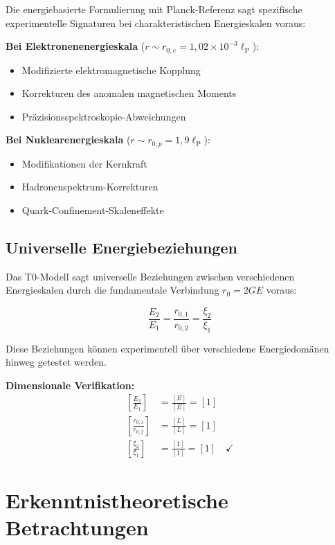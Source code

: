 \documentclass[12pt,a4paper]{report}
\newcommand{\lP}{\ell_{\text{P}}}         %
\newcommand{\rzero}{r_0}                  %
\begin{document}
	Die energiebasierte Formulierung mit Planck-Referenz sagt spezifische experimentelle Signaturen bei charakteristischen Energieskalen voraus:
	
	\textbf{Bei Elektronenenergieskala} ($r \sim r_{0,e} = 1,02 \times 10^{-3} \lP$):
	\begin{itemize}
		\item Modifizierte elektromagnetische Kopplung
		\item Korrekturen des anomalen magnetischen Moments
		\item Präzisionsspektroskopie-Abweichungen
	\end{itemize}
	
	\textbf{Bei Nuklearenergieskala} ($r \sim r_{0,p} = 1,9 \lP$):
	\begin{itemize}
		\item Modifikationen der Kernkraft
		\item Hadronenspektrum-Korrekturen
		\item Quark-Confinement-Skaleneffekte
	\end{itemize}
	
	\subsection{Universelle Energiebeziehungen}\label{subsec:universal_energy_relationships}
	
	Das T0-Modell sagt universelle Beziehungen zwischen verschiedenen Energieskalen durch die fundamentale Verbindung $\rzero = 2GE$ voraus:
	
	\begin{equation}
		\frac{E_2}{E_1} = \frac{r_{0,1}}{r_{0,2}} = \frac{\xi_{2}}{\xi_{1}}
		\label{eq:universal_energy_ratios}
	\end{equation}
	
	Diese Beziehungen können experimentell über verschiedene Energiedomänen hinweg getestet werden.
	
	\textbf{Dimensionale Verifikation:}
	\begin{align}
		\left[\frac{E_2}{E_1}\right] &= \frac{[E]}{[E]} = [1] \\
		\left[\frac{r_{0,1}}{r_{0,2}}\right] &= \frac{[L]}{[L]} = [1] \\
		\left[\frac{\xi_{2}}{\xi_{1}}\right] &= \frac{[1]}{[1]} = [1] \quad \checkmark
	\end{align}
	
	\section{Erkenntnistheoretische Betrachtungen}\label{sec:epistemological}
	
\end{document}
